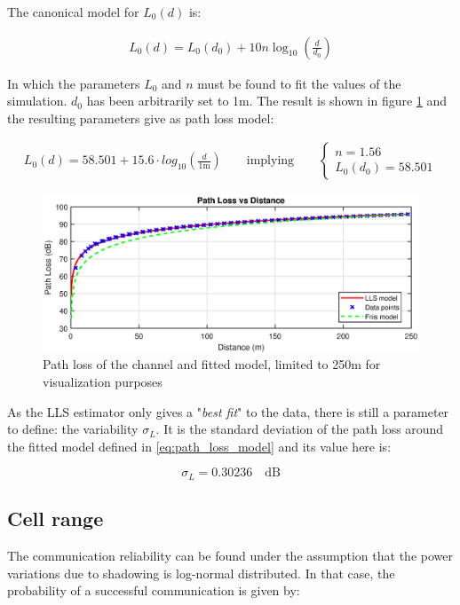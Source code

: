 \documentclass[10pt,a4paper]{ULBreport}
\begin{document}
The canonical model for $L_0(d)$ is:

\begin{align*}
    L_0(d) = L_0(d_0) + 10 n \log_{10} \left(\frac{d}{d_0}\right)
\end{align*}

In which the parameters $L_0$ and $n$ must be found to fit the values of the simulation. $d_0$ has been arbitrarily set to 1m. The result is shown in figure \ref{fig:path_loss} and the resulting parameters give as path loss model:

\begin{align}
    \label{eq:path_loss_model}
    L_0(d) = 58.501 + 15.6 \cdot log_{10} \left(\frac{d}{1\text{m}}\right)
    \qquad
    \text{implying} \qquad \left\{
    \begin{array}{l}
        n = 1.56 \\
        L_0(d_0) = 58.501
    \end{array}
    \right.
\end{align}

\begin{figure}[H]
    \centering
    \includegraphics[width=1\textwidth]{3_5_model.eps}
    \caption{Path loss of the channel and fitted model, limited to 250m for visualization purposes}
    \label{fig:path_loss}
\end{figure}

As the LLS estimator only gives a "\textit{best fit}" to the data, there is still a parameter to define: the variability $\sigma_L$. It is the standard deviation of the path loss around the fitted model defined in \ref{eq:path_loss_model} and its value here is:

\begin{equation*}
    \sigma_L = 0.30236 \quad \text{dB}
\end{equation*}

\subsection{Cell range}
\label{sec:cell_range}
The communication reliability can be found under the assumption that the power variations due to shadowing is log-normal distributed. In that case, the probability of a successful communication is given by:
\end{document}
